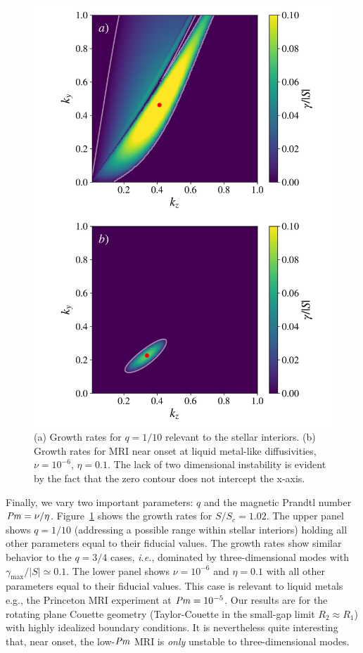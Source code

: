 \documentclass[aps,prl,reprint,superscriptaddress]{revtex4-1}
\newcommand{\SSC}{S/S_{c}}
\newcommand{\Prm}{\mbox{\textit{Pm}}}
\begin{document}
\begin{figure}[h!]
  \centering
  \includegraphics[width=\columnwidth]{low_rossby_liquid_metal_growth_rates.pdf}
  \caption{(a) Growth rates for $q=1/10$ relevant to the stellar interiors. 
  (b) Growth rates for MRI near onset at liquid metal-like diffusivities, $\nu=10^{-6}$, $\eta=0.1$.
The lack of two dimensional instability is evident by the fact that the zero contour does not intercept the x-axis.}
  \label{fig:other_params}
\end{figure}
Finally, we vary two important parameters:
$q$ and the magnetic Prandtl number $\Prm=\nu/\eta$.
Figure~\ref{fig:other_params} shows the growth rates for $\SSC=1.02$.
The upper panel shows $q=1/10$ (addressing a possible range within stellar interiors) holding all other parameters equal to their fiducial values.
The growth rates show similar behavior to the $q=3/4$ cases, \textit{i.e.}, dominated by three-dimensional modes with $\gamma_{\max}/|S|\simeq0.1$.
The lower panel shows $\nu=10^{-6}$ and $\eta=0.1$ with all other parameters equal to their fiducial values. 
This case is relevant to liquid metals e.g., the Princeton MRI experiment \citep{2002JFM...462..365G}
at $\Prm=10^{-5}$. 
Our results are for the rotating plane Couette geometry (Taylor-Couette in the small-gap limit $R_{2}\approx{R}_{1}$) with highly idealized boundary conditions.
It is nevertheless quite interesting that, near onset, the low-$\Prm$ MRI is \emph{only} unstable to three-dimensional modes.
\end{document}
